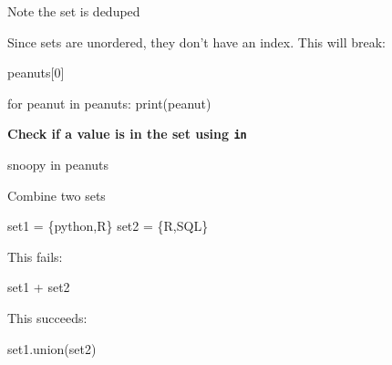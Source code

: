 \documentclass[
  letterpaper,
  DIV=11,
  numbers=noendperiod]{scrreprt}
\newenvironment{Shaded}{\begin{snugshade}}{\end{snugshade}}
\newcommand{\BuiltInTok}[1]{\textcolor[rgb]{0.00,0.23,0.31}{#1}}
\newcommand{\CommentTok}[1]{\textcolor[rgb]{0.37,0.37,0.37}{#1}}
\newcommand{\ControlFlowTok}[1]{\textcolor[rgb]{0.00,0.23,0.31}{#1}}
\newcommand{\DecValTok}[1]{\textcolor[rgb]{0.68,0.00,0.00}{#1}}
\newcommand{\KeywordTok}[1]{\textcolor[rgb]{0.00,0.23,0.31}{#1}}
\newcommand{\NormalTok}[1]{\textcolor[rgb]{0.00,0.23,0.31}{#1}}
\newcommand{\OperatorTok}[1]{\textcolor[rgb]{0.37,0.37,0.37}{#1}}
\newcommand{\StringTok}[1]{\textcolor[rgb]{0.13,0.47,0.30}{#1}}
\begin{document}
Note the set is deduped

Since sets are unordered, they don't have an index. This will break:

\begin{Shaded}
\begin{Highlighting}[]
\NormalTok{peanuts[}\DecValTok{0}\NormalTok{]}
\end{Highlighting}
\end{Shaded}

\begin{Shaded}
\begin{Highlighting}[]
\ControlFlowTok{for}\NormalTok{ peanut }\KeywordTok{in}\NormalTok{ peanuts:}
    \BuiltInTok{print}\NormalTok{(peanut)}
\end{Highlighting}
\end{Shaded}

\textbf{Check if a value is in the set using \texttt{in}}

\begin{Shaded}
\begin{Highlighting}[]
\CommentTok{\textquotesingle{}snoopy\textquotesingle{}} \KeywordTok{in}\NormalTok{ peanuts}
\end{Highlighting}
\end{Shaded}

Combine two sets

\begin{Shaded}
\begin{Highlighting}[]
\NormalTok{set1 }\OperatorTok{=}\NormalTok{ \{}\StringTok{\textquotesingle{}python\textquotesingle{}}\NormalTok{,}\StringTok{\textquotesingle{}R\textquotesingle{}}\NormalTok{\}}
\NormalTok{set2 }\OperatorTok{=}\NormalTok{ \{}\StringTok{\textquotesingle{}R\textquotesingle{}}\NormalTok{,}\StringTok{\textquotesingle{}SQL\textquotesingle{}}\NormalTok{\}}
\end{Highlighting}
\end{Shaded}

This fails:

\begin{Shaded}
\begin{Highlighting}[]
\NormalTok{set1 }\OperatorTok{+}\NormalTok{ set2}
\end{Highlighting}
\end{Shaded}

This succeeds:

\begin{Shaded}
\begin{Highlighting}[]
\NormalTok{set1.union(set2)}
\end{Highlighting}
\end{Shaded}
\end{document}
